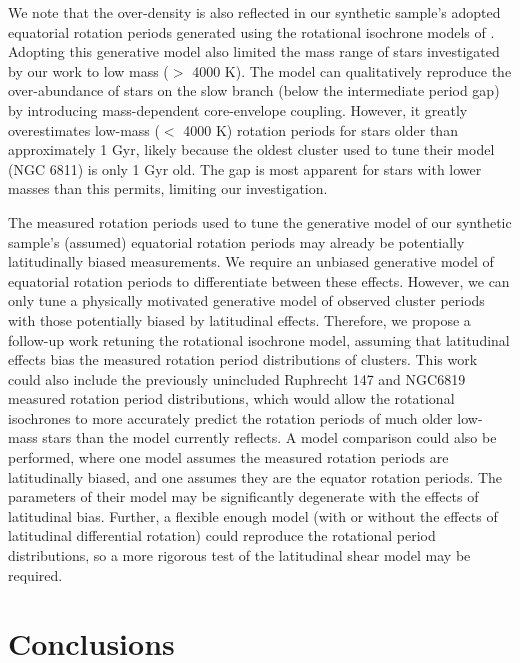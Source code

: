 We note that the over-density is also reflected in our synthetic sample's adopted equatorial rotation periods generated using the rotational isochrone models of \citet{spada_competing_2020}.
Adopting this generative model also limited the mass range of stars investigated by our work to low mass ($>$ 4000 K).
The model can qualitatively reproduce the over-abundance of stars on the slow branch (below the intermediate period gap) by introducing mass-dependent core-envelope coupling.
However, it greatly overestimates low-mass ($<$ 4000 K) rotation periods for stars older than approximately 1 Gyr, likely because the oldest cluster used to tune their model (NGC 6811) is only 1 Gyr old. 
The gap is most apparent for stars with lower masses than this permits, limiting our investigation.

The measured rotation periods used to tune the generative model of our synthetic sample's (assumed) equatorial rotation periods may already be potentially latitudinally biased measurements. 
We require an unbiased generative model of equatorial rotation periods to differentiate between these effects.
However, we can only tune a physically motivated generative model of observed cluster periods with those potentially biased by latitudinal effects.
Therefore, we propose a follow-up work retuning the rotational isochrone model, assuming that latitudinal effects bias the measured rotation period distributions of clusters.
This work could also include the previously unincluded Ruphrecht 147 \citep{curtis_when_2020} and NGC6819 \citep{meibom_kepler_2011} measured rotation period distributions, which would allow the rotational isochrones to more accurately predict the rotation periods of much older low-mass stars than the model currently reflects.
A model comparison could also be performed, where one model assumes the measured rotation periods are latitudinally biased, and one assumes they are the equator rotation periods.
The parameters of their model may be significantly degenerate with the effects of latitudinal bias.
Further, a flexible enough model (with or without the effects of latitudinal differential rotation) could reproduce the rotational period distributions, so a more rigorous test of the latitudinal shear model may be required.


\section{Conclusions}
\label{sec:conclusione}

